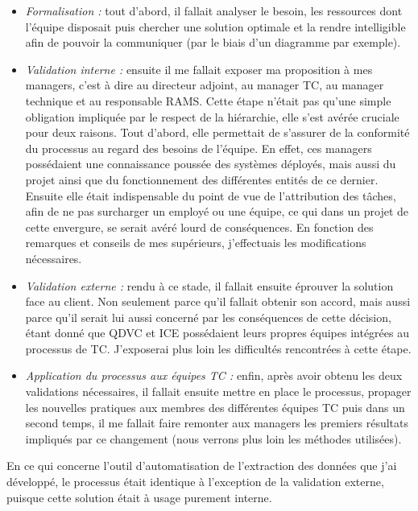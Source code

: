 \begin{itemize}
\item \textit{Formalisation :} tout d'abord, il fallait analyser le besoin, les ressources dont l'équipe disposait puis chercher une solution optimale et la rendre intelligible afin de pouvoir la communiquer (par le biais d'un diagramme par exemple).
\item \textit{Validation interne :} ensuite il me fallait exposer ma proposition à mes managers, c'est à dire au directeur adjoint, au manager \gls{TC}, au manager technique et au responsable \gls{RAMS}. Cette étape n'était pas qu'une simple obligation impliquée par le respect de la hiérarchie, elle s'est avérée cruciale pour deux raisons. Tout d'abord, elle permettait de s'assurer de la conformité du processus au regard des besoins de l'équipe. En effet, ces managers possédaient une connaissance poussée des systèmes déployés, mais aussi du projet ainsi que du fonctionnement des différentes entités de ce dernier. Ensuite elle était indispensable du point de vue de l'attribution des tâches, afin de ne pas surcharger un employé ou une équipe, ce qui dans un projet de cette envergure, se serait avéré lourd de conséquences. En fonction des remarques et conseils de mes supérieurs, j'effectuais les modifications nécessaires.
\item \textit{Validation externe :} rendu à ce stade, il fallait ensuite éprouver la solution face au client. Non seulement parce qu'il fallait obtenir son accord, mais aussi parce qu'il serait lui aussi concerné par les conséquences de cette décision, étant donné que QDVC et ICE possédaient leurs propres équipes intégrées au processus de \gls{TC}. J'exposerai plus loin les difficultés rencontrées à cette étape.
\item \textit{Application du processus aux équipes \gls{TC} :} enfin, après avoir obtenu les deux validations nécessaires, il fallait ensuite mettre en place le processus, propager les nouvelles pratiques aux membres des différentes équipes \gls{TC} puis dans un second temps, il me fallait faire remonter aux managers les premiers résultats impliqués par ce changement (nous verrons plus loin les méthodes utilisées).
\end{itemize}

En ce qui concerne l'outil d'automatisation de l'extraction des données que j'ai développé, le processus était identique à l'exception de la validation externe, puisque cette solution était à usage purement interne.


